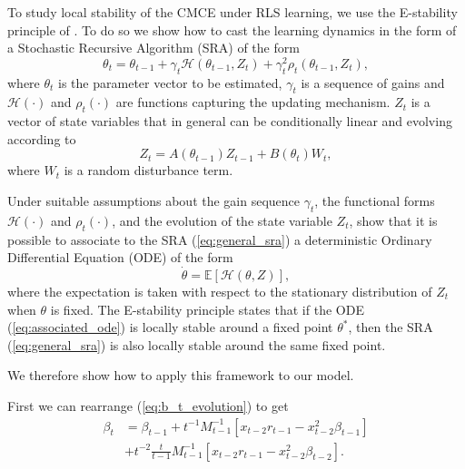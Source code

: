 \documentclass[11pt]{article}
\begin{document}
To study local stability of the CMCE under RLS learning, we use the E-stability principle of \cite{GeorgeWEvans2001}.
To do so we show how to cast the learning dynamics in the form of a Stochastic Recursive Algorithm (SRA) of the form 
\begin{equation}\label{eq:general_sra}
    \theta_t = \theta_{t-1} + \gamma_t \mathcal{H}(\theta_{t-1}, Z_t) + \gamma_t^2 \rho_t(\theta_{t-1}, Z_t),
\end{equation}
where $\theta_t$ is the parameter vector to be estimated, $\gamma_t$ is a sequence of gains and $\mathcal{H}(\cdot)$ and $\rho_t(\cdot)$ are functions capturing the updating mechanism.
$Z_t$ is a vector of state variables that in general can be conditionally linear and evolving according to
\begin{equation}\label{eq:state_evolution_sra}
    Z_t = A(\theta_{t-1}) Z_{t-1} + B(\theta_t) W_{t},
\end{equation}
where $W_t$ is a random disturbance term. 

Under suitable assumptions about the gain sequence $\gamma_t$, the functional forms $\mathcal{H}(\cdot)$ and $\rho_t(\cdot)$, and the evolution of the state variable $Z_t$,
\cite{GeorgeWEvans2001} show that it is possible to associate to the SRA (\ref{eq:general_sra}) a deterministic Ordinary Differential Equation (ODE) of the form
\begin{equation}\label{eq:associated_ode}
    \dot{\theta} = \mathbb{E}\left[\mathcal{H}(\theta, Z)\right],
\end{equation}
where the expectation is taken with respect to the stationary distribution of $Z_t$ when $\theta$ is fixed.
The E-stability principle states that if the ODE (\ref{eq:associated_ode}) is locally stable around a fixed point $\theta^*$, then the SRA (\ref{eq:general_sra}) is also locally stable around the same fixed point.

We therefore show how to apply this framework to our model.

First we can rearrange (\ref{eq:b_t_evolution}) to get
\begin{equation}
    \begin{aligned}
        \beta_t & = \beta_{t-1} + t^{-1} M^{-1}_{t-1} \left[ x_{t-2} r_{t-1} - x_{t-2}^2 \beta_{t-1} \right] \\
        & + t^{-2} \frac{t}{t-1} M^{-1}_{t-1} \left[ x_{t-2} r_{t-1} - x_{t-2}^2 \beta_{t-2} \right].
    \end{aligned}
\end{equation}
\end{document}
